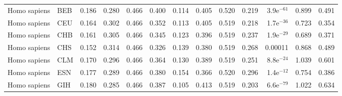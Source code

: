 \begin{longtable}{llrrrrrrrrrrr}
        Homo sapiens &                       BEB &                              0.186 &                               0.280 &                 0.466 &                 0.400 &                              0.114 &                               0.405 &                 0.520 &                 0.219 &  3.9e$^{-61}$ &  0.899 &  0.491 \\
        Homo sapiens &                       CEU &                              0.164 &                               0.302 &                 0.466 &                 0.352 &                              0.113 &                               0.405 &                 0.519 &                 0.218 &  1.7e$^{-36}$ &  0.723 &  0.354 \\
        Homo sapiens &                       CHB &                              0.161 &                               0.305 &                 0.466 &                 0.345 &                              0.123 &                               0.396 &                 0.519 &                 0.237 &  1.9e$^{-29}$ &  0.689 &  0.371 \\
        Homo sapiens &                       CHS &                              0.152 &                               0.314 &                 0.466 &                 0.326 &                              0.139 &                               0.380 &                 0.519 &                 0.268 &       0.00011 &  0.868 &  0.489 \\
        Homo sapiens &                       CLM &                              0.170 &                               0.296 &                 0.466 &                 0.364 &                              0.130 &                               0.389 &                 0.519 &                 0.251 &  8.8e$^{-24}$ &  1.039 &  0.601 \\
        Homo sapiens &                       ESN &                              0.177 &                               0.289 &                 0.466 &                 0.380 &                              0.154 &                               0.366 &                 0.520 &                 0.296 &  1.4e$^{-12}$ &  0.754 &  0.386 \\
        Homo sapiens &                       GIH &                              0.180 &                               0.285 &                 0.466 &                 0.387 &                              0.105 &                               0.413 &                 0.519 &                 0.203 &  6.6e$^{-79}$ &  1.022 &  0.634 \\

\end{longtable}
